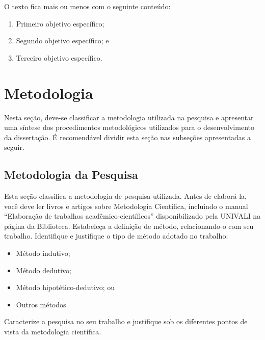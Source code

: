 O texto fica mais ou menos com o seguinte conteúdo:

\begin{enumerate}
    \item Primeiro objetivo específico;
    
    \item Segundo objetivo específico; e

    \item Terceiro objetivo específico.
\end{enumerate}




\section{Metodologia}
\label{s_cintro_metodologia}

Nesta seção, deve-se classificar a metodologia utilizada na pesquisa e apresentar uma síntese dos procedimentos metodológicos utilizados para o desenvolvimento da dissertação. É recomendável dividir esta seção nas subseções apresentadas a seguir. 


\subsection{Metodologia da Pesquisa}
\label{ss_cintro_metod_pesquisa}

Esta seção classifica a metodologia de pesquisa utilizada. Antes de elaborá-la, você deve ler livros e artigos sobre Metodologia Científica, incluindo o manual “Elaboração de trabalhos acadêmico-científicos” disponibilizado pela UNIVALI na página da Biblioteca. 
Estabeleça a definição de método, relacionando-o com seu trabalho. Identifique e justifique o tipo de método adotado no trabalho:

\begin{itemize}   
    \item Método indutivo;
    
    \item Método dedutivo;

    \item Método hipotético-dedutivo; ou
    
    \item Outros métodos
\end{itemize}

Caracterize a pesquisa no seu trabalho e justifique sob os diferentes pontos de vista da metodologia científica. 

